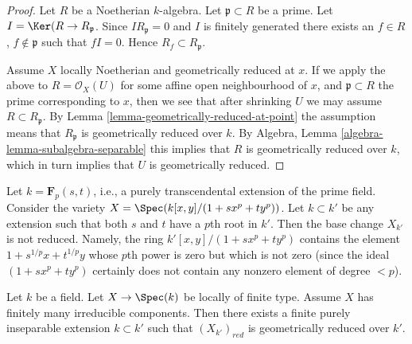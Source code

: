 \begin{proof}
Let $R$ be a Noetherian $k$-algebra.
Let $\mathfrak p \subset R$ be a prime.
Let $I = \Ker(R \to R_{\mathfrak p}$.
Since $IR_{\mathfrak p} = 0$ and $I$ is finitely generated
there exists an $f \in R$, $f \not \in \mathfrak p$ such that $fI = 0$.
Hence $R_f \subset R_{\mathfrak p}$.

\medskip\noindent
Assume $X$ locally Noetherian and geometrically reduced at $x$.
If we apply the above to $R = \mathcal{O}_X(U)$ for some affine
open neighbourhood of $x$, and $\mathfrak p \subset R$ the prime
corresponding to $x$, then we see that after shrinking $U$ we may
assume $R \subset R_{\mathfrak p}$. By
Lemma \ref{lemma-geometrically-reduced-at-point} the assumption
means that $R_{\mathfrak p}$ is geometrically reduced over $k$.
By Algebra, Lemma \ref{algebra-lemma-subalgebra-separable}
this implies that $R$ is geometrically reduced over $k$, which
in turn implies that $U$ is geometrically reduced.
\end{proof}

\begin{example}
\label{example-not-geometrically-reduced}
Let $k = \mathbf{F}_p(s, t)$, i.e., a purely transcendental extension
of the prime field. Consider the variety
$X = \Spec(k[x, y]/(1 + sx^p + ty^p))$.
Let $k \subset k'$ be any extension such that
both $s$ and $t$ have a $p$th root in $k'$.
Then the base change $X_{k'}$ is not reduced.
Namely, the ring $k'[x, y]/(1 + s x^p + ty^p)$ contains the element
$1 + s^{1/p}x + t^{1/p}y$ whose $p$th power is zero but
which is not zero (since the ideal $(1 + sx^p + ty^p)$ certainly
does not contain any nonzero element of degree $< p$).
\end{example}

\begin{lemma}
\label{lemma-finite-extension-geometrically-reduced}
Let $k$ be a field.
Let $X \to \Spec(k)$ be locally of finite type.
Assume $X$ has finitely many irreducible components.
Then there exists a finite purely inseparable extension $k \subset k'$
such that $(X_{k'})_{red}$ is geometrically reduced over $k'$.
\end{lemma}

